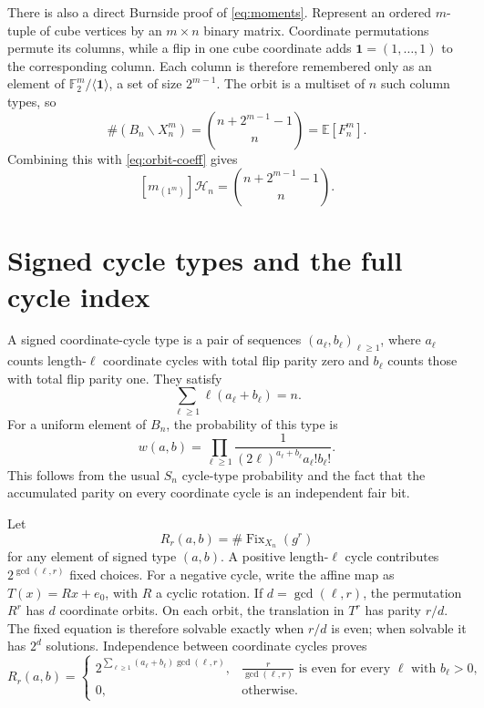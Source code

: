 \documentclass[11pt]{article}
\newcommand{\F}{\mathbb F}
\newcommand{\E}{\mathbb E}
\newcommand{\Fix}{\operatorname{Fix}}
\begin{document}
There is also a direct Burnside proof of \eqref{eq:moments}.  Represent an
ordered $m$-tuple of cube vertices by an $m\times n$ binary matrix.  Coordinate
permutations permute its columns, while a flip in one cube coordinate adds
$\mathbf1=(1,\ldots,1)$ to the corresponding column.  Each column is therefore
remembered only as an element of
$\F_2^m/\langle\mathbf1\rangle$, a set of size $2^{m-1}$.  The orbit is a
multiset of $n$ such column types, so
\[
\#(B_n\backslash X_n^m)=\binom{n+2^{m-1}-1}{n}=\E[F_n^m].
\]
Combining this with \eqref{eq:orbit-coeff} gives
\begin{equation}\label{eq:moment-coeff}
[m_{(1^m)}]\mathcal H_n=\binom{n+2^{m-1}-1}{n}.
\end{equation}

\section{Signed cycle types and the full cycle index}
A signed coordinate-cycle type is a pair of sequences
$(a_\ell,b_\ell)_{\ell\geq1}$, where $a_\ell$ counts length-$\ell$
coordinate cycles with total flip parity zero and $b_\ell$ counts those with
total flip parity one.  They satisfy
\[
\sum_{\ell\geq1}\ell(a_\ell+b_\ell)=n.
\]
For a uniform element of $B_n$, the probability of this type is
\begin{equation}\label{eq:type-probability}
w(a,b)=\prod_{\ell\geq1}
\frac1{(2\ell)^{a_\ell+b_\ell}a_\ell!b_\ell!}.
\end{equation}
This follows from the usual $S_n$ cycle-type probability and the fact that
the accumulated parity on every coordinate cycle is an independent fair bit.

Let
\[
R_r(a,b)=\#\Fix_{X_n}(g^r)
\]
for any element of signed type $(a,b)$.  A positive length-$\ell$ cycle
contributes $2^{\gcd(\ell,r)}$ fixed choices.  For a negative cycle, write the
affine map as $T(x)=Rx+e_0$, with $R$ a cyclic rotation.  If
$d=\gcd(\ell,r)$, the permutation $R^r$ has $d$ coordinate orbits.  On each
orbit, the translation in $T^r$ has parity $r/d$.  The fixed equation is
therefore solvable exactly when $r/d$ is even; when solvable it has $2^d$
solutions.  Independence between coordinate cycles proves
\begin{equation}\label{eq:fixed-powers}
R_r(a,b)=
\begin{cases}
\displaystyle
2^{\sum_{\ell\geq1}(a_\ell+b_\ell)\gcd(\ell,r)},
&\displaystyle
\frac r{\gcd(\ell,r)}\text{ is even for every }\ell\text{ with }b_\ell>0,
\\[8pt]
0,&\text{otherwise}.
\end{cases}
\end{equation}
\end{document}

